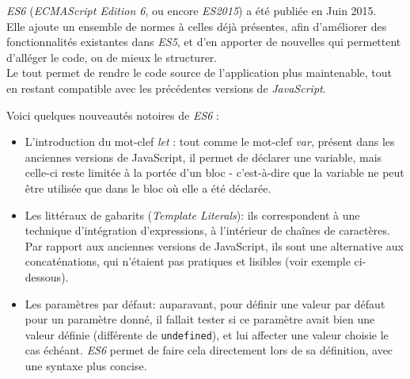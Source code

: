 \bigskip

\emph{ES6} (\emph{ECMAScript Edition 6}, ou encore \emph{ES2015}) a été
publiée en Juin 2015.\\
Elle ajoute un ensemble de normes à celles déjà présentes, afin
d'améliorer des fonctionnalités existantes dans \emph{ES5}, et d'en
apporter de nouvelles qui permettent d'alléger le code, ou de mieux le
structurer.\\
Le tout permet de rendre le code source de l'application plus
maintenable, tout en restant compatible avec les précédentes versions de
\emph{JavaScript}.

\bigskip

Voici quelques nouveautés notoires de \emph{ES6} :

\begin{itemize}
\item
  L'introduction du mot-clef \emph{let} : tout comme le mot-clef
  \emph{var}, présent dans les anciennes versions de JavaScript, il
  permet de déclarer une variable, mais celle-ci reste limitée à la
  portée d'un bloc - c'est-à-dire que la variable ne peut être utilisée
  que dans le bloc où elle a été déclarée.
\item
  Les littéraux de gabarits (\emph{Template Literals}): ils
  correspondent à une technique d'intégration d'expressions, à
  l'intérieur de chaînes de caractères. Par rapport aux anciennes
  versions de JavaScript, ils sont une alternative aux concaténations,
  qui n'étaient pas pratiques et lisibles (voir exemple ci-dessous).

\begin{Shaded}
\begin{Highlighting}[]
 \OperatorTok{=} 
 \OperatorTok{=} \SpecialCharTok{$\{}\SpecialCharTok{\}}
 \OperatorTok{=} \OperatorTok{;}
 \OperatorTok{=}  \OperatorTok{+} \OperatorTok{;}
\end{Highlighting}
\end{Shaded}
\item
  Les paramètres par défaut: auparavant, pour définir une valeur par
  défaut pour un paramètre donné, il fallait tester si ce paramètre
  avait bien une valeur définie (différente de \texttt{undefined}), et
  lui affecter une valeur choisie le cas échéant. \emph{ES6} permet de
  faire cela directement lors de sa définition, avec une syntaxe plus
  concise.


\end{itemize}

